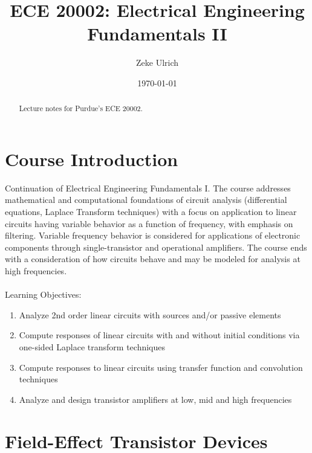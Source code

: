 \documentclass[nobib]{tufte-handout}
\title{ECE 20002: Electrical Engineering Fundamentals II}
\author[Zeke Ulrich]{Zeke Ulrich}
\date{\today}  %
\begin{document}
\maketitle

\begin{abstract}
    Lecture notes for Purdue's ECE 20002.
\end{abstract}

\tableofcontents

\section{Course Introduction}

Continuation of Electrical Engineering Fundamentals I. The course addresses
mathematical and computational foundations of circuit analysis (differential
equations, Laplace Transform techniques) with a focus on application to linear
circuits having variable behavior as a function of frequency, with emphasis on
filtering. Variable frequency behavior is considered for applications of
electronic components through single-transistor and operational amplifiers. The
course ends with a consideration of how circuits behave and may be modeled for
analysis at high frequencies.\\~\\ Learning Objectives:
\begin{enumerate}
    \item Analyze 2nd order linear circuits with sources and/or passive elements
    \item Compute responses of linear circuits with and without initial conditions via
          one-sided Laplace transform techniques
    \item Compute responses to linear circuits using transfer function and convolution
          techniques
    \item Analyze and design transistor amplifiers at low, mid and high frequencies
\end{enumerate}

\pagebreak

\section{Field-Effect Transistor Devices}
\end{document}
